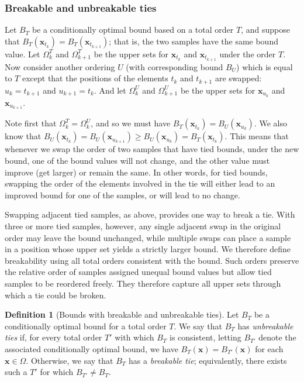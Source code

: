 \documentclass{article}
\theoremstyle{definition}
\newtheorem{definition}{Definition}[section]
\theoremstyle{remark}
\def\x{\mathbf{x}}
\begin{document}
\subsubsection{Breakable and unbreakable ties}
Let $B_T$ be a conditionally optimal bound based on a total order $T$, and suppose that $B_T(\x_{t_k})=B_T(\x_{t_{k+1}})$; that is, the two samples have the same bound value. Let $\Omega_k^T$ and $\Omega_{k+1}^T$ be the upper sets for $\x_{t_k}$ and $\x_{t_{k+1}}$ under the order $T$. Now consider another ordering $U$ (with corresponding bound $B_U$) which is equal to $T$ except that the positions of the elements $t_k$ and $t_{k+1}$ are swapped: $u_k=t_{k+1}$ and $u_{k+1}=t_k$.  And let $\Omega_k^U$ and $\Omega_{k+1}^U$ be the upper sets for $\x_{u_k}$ and $\x_{u_{k+1}}$. 

Note first that $\Omega^T_k=\Omega^U_k$, and so we must have $B_T(\x_{t_k})=B_U(\x_{u_k})$.  We also know that $B_U(\x_{t_k})=B_U(\x_{u_{k+1}})\geq B_U(\x_{u_k})=B_T(\x_{t_k})$. This means that whenever we swap the order of two samples that have tied bounds, under the new bound, one of the bound values will not change, and the other value must improve (get larger) or remain the same.  In other words, for tied bounds, swapping the order of the elements involved in the tie will either lead to an improved bound for one of the samples, or will lead to no change.

Swapping adjacent tied samples, as above, provides one way to break a tie. With three or more tied samples, however, any single adjacent swap in the original order may leave the bound unchanged, while multiple swaps can place a sample in a position whose upper set yields a strictly larger bound. We therefore define breakability using all total orders consistent with the bound. Such orders preserve the relative order of samples assigned unequal bound values but allow tied samples to be reordered freely. They therefore capture all upper sets through which a tie could be broken.

\begin{definition}[Bounds with breakable and unbreakable ties]
\label{def:unbreakable}
Let $B_T$ be a conditionally optimal bound for a total order $T$. We say that $B_T$ has \emph{unbreakable ties} if, for every total order $T'$ with which $B_T$ is consistent, letting $B_{T'}$ denote the associated conditionally optimal bound, we have $B_T(\x) = B_{T'}(\x)$ for each $\x \in \Omega$. Otherwise, we say that $B_T$ has a \emph{breakable tie}; equivalently, there exists such a $T'$ for which $B_{T'} \neq B_T$.
\end{definition}
\end{document}
